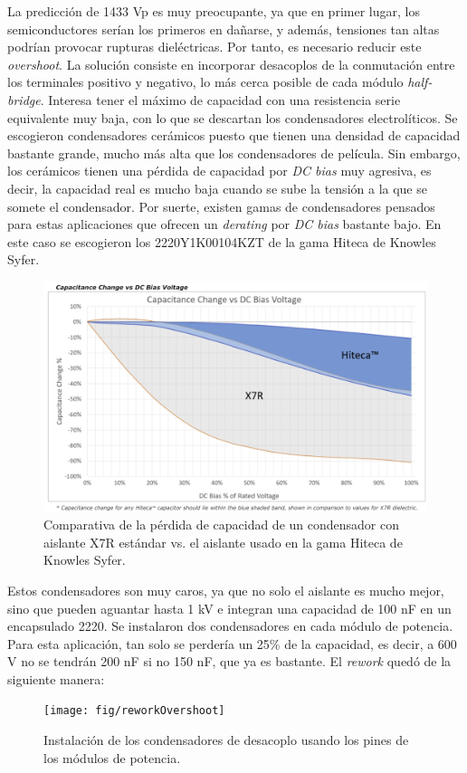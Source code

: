La predicción de 1433 Vp es muy preocupante, ya que en primer lugar, los semiconductores serían los primeros en dañarse, y además, tensiones tan altas podrían provocar rupturas dieléctricas. Por tanto, es necesario reducir este \textit{overshoot}. La solución consiste en incorporar desacoplos de la conmutación entre los terminales positivo y negativo, lo más cerca posible de cada módulo \textit{half-bridge}. Interesa tener el máximo de capacidad con una resistencia serie equivalente muy baja, con lo que se descartan los condensadores electrolíticos. Se escogieron condensadores cerámicos puesto que tienen una densidad de capacidad bastante grande, mucho más alta que los condensadores de película. Sin embargo, los cerámicos tienen una pérdida de capacidad por \textit{DC bias} muy agresiva, es decir, la capacidad real es mucho baja  cuando se sube la tensión a la que se somete el condensador. Por suerte, existen gamas de condensadores pensados para estas aplicaciones que ofrecen un \textit{derating} por \textit{DC bias} bastante bajo. En este caso se escogieron los 2220Y1K00104KZT de la gama Hiteca de Knowles Syfer.

\begin{figure}[H]
	\centering
	\includegraphics[width=0.7\linewidth]{fig/hiteca}
	\caption{Comparativa de la pérdida de capacidad de un condensador con aislante X7R estándar vs. el aislante usado en la gama Hiteca de Knowles Syfer.}
\end{figure}

Estos condensadores son muy caros, ya que no solo el aislante es mucho mejor, sino que pueden aguantar hasta 1 kV e integran una capacidad de 100 nF en un encapsulado 2220. Se instalaron dos condensadores en cada módulo de potencia. Para esta aplicación, tan solo se perdería un 25\% de la capacidad, es decir, a 600 V no se tendrán 200 nF si no 150 nF, que ya es bastante. El \textit{rework} quedó de la siguiente manera:


\begin{figure}[H]
	\centering
	\texttt{[image: fig/reworkOvershoot]}
	\caption{Instalación de los condensadores de desacoplo usando los pines de los módulos de potencia.}
\end{figure}

